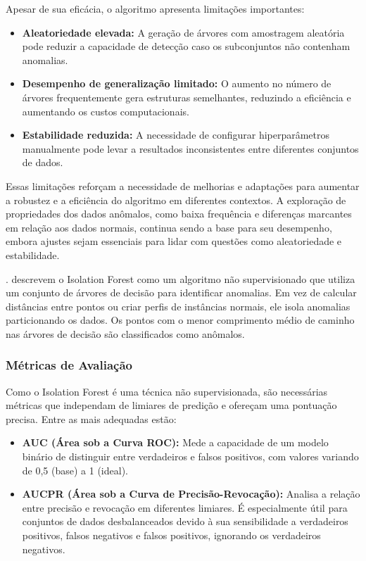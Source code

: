 \documentclass[12pt,a4paper]{article}
\begin{document}
Apesar de sua eficácia, o algoritmo apresenta limitações importantes:
\begin{itemize}
    \item \textbf{Aleatoriedade elevada:} A geração de árvores com amostragem aleatória pode reduzir a capacidade de detecção caso os subconjuntos não contenham anomalias.
    \item \textbf{Desempenho de generalização limitado:} O aumento no número de árvores frequentemente gera estruturas semelhantes, reduzindo a eficiência e aumentando os custos computacionais.
    \item \textbf{Estabilidade reduzida:} A necessidade de configurar hiperparâmetros manualmente pode levar a resultados inconsistentes entre diferentes conjuntos de dados.
\end{itemize}

Essas limitações reforçam a necessidade de melhorias e adaptações para aumentar a robustez e a eficiência do algoritmo em diferentes contextos. A exploração de propriedades dos dados anômalos, como baixa frequência e diferenças marcantes em relação aos dados normais, continua sendo a base para seu desempenho, embora ajustes sejam essenciais para lidar com questões como aleatoriedade e estabilidade.

\cite{gupta2020}. descrevem o Isolation Forest como um algoritmo não supervisionado que utiliza um conjunto de árvores de decisão para identificar anomalias. Em vez de calcular distâncias entre pontos ou criar perfis de instâncias normais, ele isola anomalias particionando os dados. Os pontos com o menor comprimento médio de caminho nas árvores de decisão são classificados como anômalos.

\subsubsection{Métricas de Avaliação}
Como o Isolation Forest é uma técnica não supervisionada, são necessárias métricas que independam de limiares de predição e ofereçam uma pontuação precisa. Entre as mais adequadas estão:
\begin{itemize}
    \item \textbf{AUC (Área sob a Curva ROC):} Mede a capacidade de um modelo binário de distinguir entre verdadeiros e falsos positivos, com valores variando de 0,5 (base) a 1 (ideal).
    \item \textbf{AUCPR (Área sob a Curva de Precisão-Revocação):} Analisa a relação entre precisão e revocação em diferentes limiares. É especialmente útil para conjuntos de dados desbalanceados devido à sua sensibilidade a verdadeiros positivos, falsos negativos e falsos positivos, ignorando os verdadeiros negativos.
\end{itemize}
\end{document}
